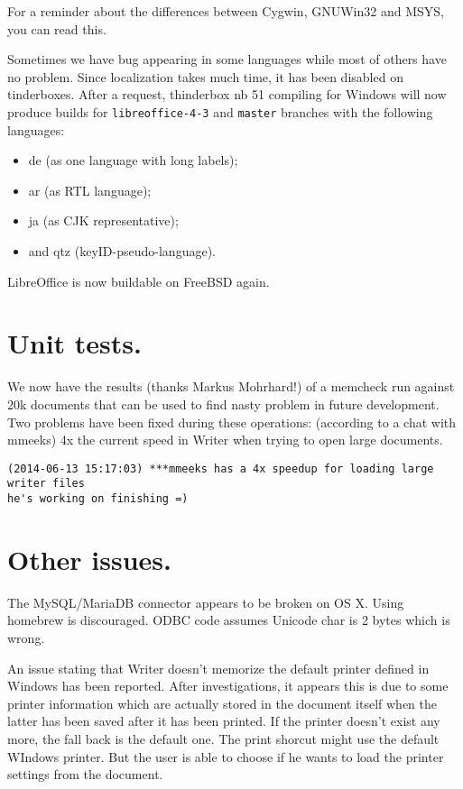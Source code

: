 \documentclass{article}
\begin{document}
For a reminder about the differences between Cygwin, GNUWin32 and MSYS, you can
read this\cite{winBuildCygwinMsysGnuWin32Comparison}.

Sometimes we have bug appearing in some languages while most of others have no
problem. Since localization takes much time, it has been disabled on
tinderboxes. After a request, thinderbox nb 51 compiling for Windows will now
produce builds for \lstinline{libreoffice-4-3} and \lstinline{master} branches
with the following languages\cite{localizedBuild}:
\begin{itemize}
    \item de (as one language with long labels);
    \item ar (as RTL language);
    \item ja (as CJK representative); 
    \item and qtz (keyID-pseudo-language).  
\end{itemize}

LibreOffice is now buildable on FreeBSD
again\cite{freeBsdBuild1}\cite{freeBsdBuild2}.



\section{Unit tests.}

We now have the results (thanks Markus Mohrhard!) of a memcheck run against 20k
documents that can be used to find nasty problem in future
development\cite{memcheckTests}. Two problems have been fixed during these
operations: (according to a chat with mmeeks) 4x the current speed in Writer
when trying to open large documents.

\begin{lstlisting}
(2014-06-13 15:17:03) ***mmeeks has a 4x speedup for loading large writer files
he's working on finishing =)
\end{lstlisting}



\section{Other issues.}

The MySQL/MariaDB connector appears to be broken on OS X. Using homebrew is
discouraged. ODBC code assumes Unicode char is 2 bytes which is
wrong\cite{sqlConnectorOsx1}\cite{sqlConnectorOsx2}.

An issue stating that Writer doesn't memorize the default printer defined in
Windows has been reported. After investigations, it appears this is due to some
printer information which are actually stored in the document itself when the
latter has been saved after it has been printed. If the printer doesn't exist
any more, the fall back is the default one\cite{writerPrinter1}. The print
shorcut might use the default WIndows printer\cite{writerPrinter2}. But the
user is able to choose if he wants to load the printer settings from the
document\cite{writerPrinter3}.
\end{document}
